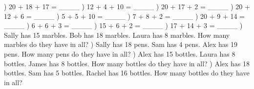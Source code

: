 \documentclass{article}%
\begin{document}
) 20 + 18 + 17 = \_\_\_\_%
\newline%
\newline%
) 12 + 4 + 10 = \_\_\_\_%
\newline%
\newline%
) 20 + 17 + 2 = \_\_\_\_%
\newline%
\newline%
) 20 + 12 + 6 = \_\_\_\_%
\newline%
\newline%
) 5 + 5 + 10 = \_\_\_\_%
\newline%
\newline%
) 7 + 8 + 2 = \_\_\_\_%
\newline%
\newline%
) 20 + 9 + 14 = \_\_\_\_%
\newline%
\newline%
) 6 + 6 + 3 = \_\_\_\_%
\newline%
\newline%
) 15 + 6 + 2 = \_\_\_\_%
\newline%
\newline%
) 17 + 14 + 3 = \_\_\_\_%
\newline%
\newline%
) Sally has 15 marbles. Bob has 18 marbles. Laura has 8 marbles. How many marbles do they have in all?%
\newline%
\newline%
) Sally has 18 pens. Sam has 4 pens. Alex has 19 pens. How many pens do they have in all?%
\newline%
\newline%
) Alex has 15 bottles. Laura has 8 bottles. James has 8 bottles. How many bottles do they have in all?%
\newline%
\newline%
) Alex has 18 bottles. Sam has 5 bottles. Rachel has 16 bottles. How many bottles do they have in all?%
\end{document}
